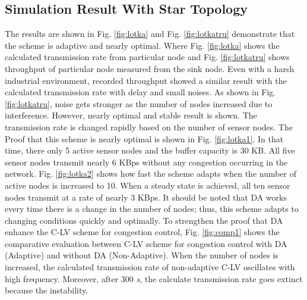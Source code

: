 \subsection{Simulation Result With Star Topology}



The results are shown in Fig. \ref{fig:lotka} and Fig. \ref{fig:lotkatru} demonstrate that the scheme is adaptive and nearly optimal. Where Fig. \ref{fig:lotka} shows the calculated transmission rate from particular node and Fig. \ref{fig:lotkatru} shows throughput of particular node measured from the sink node. Even with a harsh industrial environment, recorded throughput showed a similar result with the calculated transmission rate with delay and small noises. As shown in Fig. \ref{fig:lotkatru}, noise gets stronger as the number of nodes increased due to interference. However, nearly optimal and stable result is shown.
The transmission rate is changed rapidly based on the number of sensor nodes. The Proof that this scheme is nearly optimal is shown in Fig. \ref{fig:lotka1}. In that time, there only 5 active sensor nodes and the buffer capacity is 30 KB. All five sensor nodes transmit nearly 6 KBps without any congestion occurring in the network. Fig. \ref{fig:lotka2} shows how fast the scheme adapts when the number of active nodes is increased to 10. When a steady state is achieved, all ten sensor nodes transmit at a rate of nearly 3 KBps. It should be noted that DA works every time there is a change in the number of nodes; thus, this scheme adapts to changing conditions quickly and optimally. To strengthen the proof that DA enhance the C-LV scheme for congestion control, Fig. \ref{fig:comp1} shows the comparative evaluation between 
C-LV scheme for congestion control with DA (Adaptive) and without DA (Non-Adaptive). When the number of nodes is increased, the calculated transmission rate of non-adaptive C-LV oscillates with high frequency. Moreover, after $300$ \textit{s}, the calculate transmission rate goes extinct because the instability.
%

